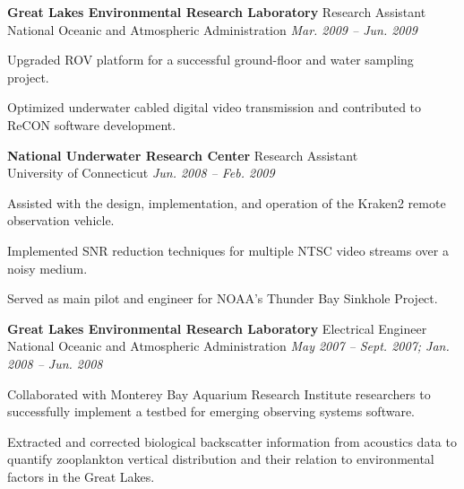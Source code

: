 \documentclass[margin, line]{resume}
\begin{document}
\begin{resume}
    \textbf{Great Lakes Environmental Research Laboratory } \hfill  Research Assistant \\ 
	National Oceanic and Atmospheric Administration \hfill \textsl{Mar. 2009 -- Jun. 2009} \\
    \vspace{ -2 mm}	
    \begin{list2}
	\item Upgraded ROV platform for a successful ground-floor and water sampling project.
	\item Optimized underwater cabled digital video transmission and contributed to ReCON software development.
    \end{list2}\vspace{-2mm}

    \textbf{National Underwater Research Center} \hfill Research Assistant \\ 
	University of Connecticut \hfill \textsl{Jun. 2008 -- Feb. 2009} \\
    \vspace{ -2 mm}	
    \begin{list2}
	\item Assisted with the design, implementation, and operation of the Kraken2 remote observation vehicle.
	\item Implemented SNR reduction techniques for multiple NTSC video streams over a noisy medium.
	\item Served as main pilot and engineer for NOAA's Thunder Bay Sinkhole Project. 
    \end{list2}\vspace{-2mm}

   \pagebreak

    \textbf{Great Lakes Environmental Research Laboratory } \hfill  Electrical Engineer \\ 
	National Oceanic and Atmospheric Administration \hfill \textsl{May 2007 -- Sept. 2007; Jan. 2008 -- Jun. 2008}  \\
    \vspace{ -2 mm}	
    \begin{list2}
	\item Collaborated with Monterey Bay Aquarium Research Institute researchers to successfully implement a testbed for emerging 	observing systems software.
	\item Extracted and corrected biological backscatter information from acoustics data to quantify zooplankton vertical distribution and 	their relation to environmental factors in the Great Lakes.
    \end{list2}\vspace{-2mm}


\end{resume}
\end{document}
